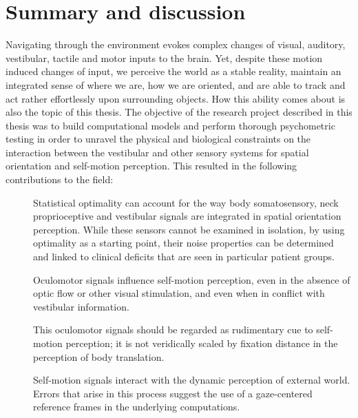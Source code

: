 \chapter{Summary and discussion}

Navigating through the environment evokes complex changes of visual, auditory, vestibular, tactile and
motor inputs to the brain. Yet, despite these motion induced changes of input, we perceive the world as a stable reality, maintain an integrated sense of where we are, how we are oriented, and are able to track and act rather effortlessly upon surrounding objects. How this ability comes about is also the topic of this thesis. The objective of the research project described in this thesis was to build computational models and perform thorough psychometric testing in order to unravel the physical and biological constraints on the interaction between the vestibular and other sensory systems for spatial orientation and self-motion perception. This resulted in the following contributions to the field:

\begin{description}
\item[\chapter{p1}] Statistical optimality can account for the way body somatosensory, neck proprioceptive and vestibular signals are integrated in spatial orientation perception. While these sensors cannot be examined in isolation, by using optimality as a starting point, their noise properties can be determined and linked to clinical deficits that are seen in particular patient groups.
\item[\chapter{p3}] Oculomotor signals influence self-motion perception, even in the absence of optic flow or other visual stimulation, and even when in conflict with vestibular information. 
\item[\chapter{p4}] This oculomotor signals should be regarded as rudimentary cue to self-motion perception; it is not veridically scaled by fixation distance in the perception of body translation. 
\item[\chapter{p2}] Self-motion signals interact with the dynamic perception of external world.  Errors that arise in this process suggest the use of a gaze-centered reference frames in the underlying computations. 
\end{description}


